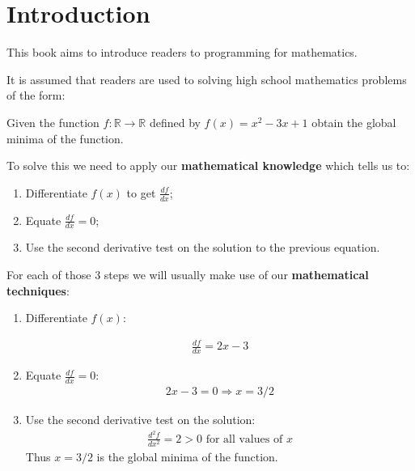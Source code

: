 \chapter{Introduction}
This book aims to introduce readers to programming for mathematics.

It is assumed that readers are used to solving high school mathematics problems
of the form:


Given the function \(f:\mathbb{R}\to\mathbb{R}\) defined by
\(f(x) = x ^ 2 - 3 x + 1\) obtain the global minima of the function.


To solve this we need to apply our \textbf{mathematical knowledge} which tells us to:

\begin{enumerate}
\item Differentiate \(f(x)\) to get \(\frac{df}{dx}\);
\item Equate \(\frac{df}{dx}=0\);
\item Use the second derivative test on the solution to the previous equation.
\end{enumerate}

For each of those 3 steps we will usually make use of our \textbf{mathematical
techniques}:
\begin{enumerate}
\item Differentiate \(f(x)\):

\begin{equation*}
\begin{split}\frac{df}{dx} = 2 x - 3\end{split}
\end{equation*}
\item Equate \(\frac{df}{dx}=0\):
\begin{equation*}
\begin{split}2x-3 =0 \Rightarrow x = 3/2\end{split}
\end{equation*}
\item Use the second derivative test on the solution:
\begin{equation*}
\begin{split}\frac{d^2f}{dx^2} = 2 > 0\text{ for all values of }x\end{split}
\end{equation*}
Thus \(x=3/2\) is the global minima of the function.

\end{enumerate}

